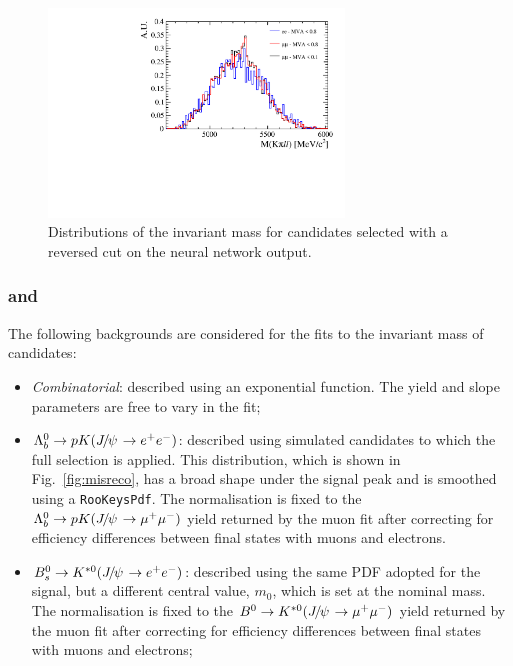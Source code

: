 \begin{figure}[t!]
\vspace{2cm}

\centering
\includegraphics[width=0.7\textwidth]{RKst/figs/Background/highq2_comb.pdf}
\caption{Distributions of the \mKpill invariant mass for \BdToKstll candidates selected with a reversed cut on the neural network output.}
\label{fig:highq2_comb}
\end{figure}

\subsubsection*{\BdToKstJPs and \BdToKstPsi}

The following backgrounds are considered for the fits to the invariant mass of \BdToKstJPsee candidates:
%
\begin{itemize}

\item \textit{Combinatorial}: described using an exponential function. The yield and slope parameters are free to vary in the fit;

\item $\Lb\to pK(\jpsi\to\ee)$: described using simulated candidates to which the full selection is applied. This distribution,
which is shown in Fig.~\ref{fig:misreco}, has a broad 
shape under the signal peak and is smoothed using a \texttt{RooKeysPdf}. The normalisation is fixed to the 
$\Lb\to pK(\jpsi\to\mumu)$ yield returned by the muon fit after correcting for efficiency differences 
between final states with muons and electrons.

\item $\Bs\to\Kstarz(\jpsi\to\ee)$: described using the same PDF adopted for the signal, but a different central value, 
$m_0$, which is set at the \Bs nominal mass. The normalisation is fixed to the $\Bd\to\Kstarz(\jpsi\to\mumu)$ yield 
returned by the muon fit after correcting for efficiency differences between final states with muons and electrons;

\end{itemize}


